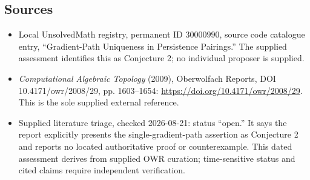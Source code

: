 \documentclass[11pt]{article}
\begin{document}
\subsection{Sources}
\begin{itemize}
\item Local UnsolvedMath registry, permanent ID \(30000990\), source code catalogue entry, ``Gradient-Path Uniqueness in Persistence Pairings.'' The supplied assessment identifies this as Conjecture 2; no individual proposer is supplied.
\item \emph{Computational Algebraic Topology} (2009), Oberwolfach Reports, DOI 10.4171/owr/2008/29, pp. 1603--1654: \url{https://doi.org/10.4171/owr/2008/29}. This is the sole supplied external reference.
\item Supplied literature triage, checked 2026-08-21: status ``open.'' It says the report explicitly presents the single-gradient-path assertion as Conjecture 2 and reports no located authoritative proof or counterexample. This dated assessment derives from supplied OWR curation; time-sensitive status and cited claims require independent verification.
\end{itemize}
\end{document}
